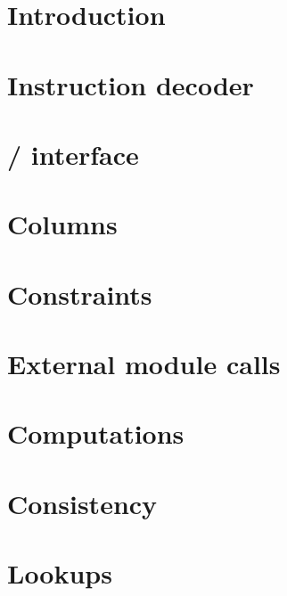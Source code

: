 

\section{Introduction}                         \label{mxp: intro}                       
\section{Instruction decoder}                  \label{mxp: instruction decoder}         
\section{\hubMod{} / \mxpMod{} interface}      \label{mxp: hub mxp interface}           
\section{Columns}                              \label{mxp: columns}                     
\section{Constraints}                          \label{mxp: constraints}                 
\section{External module calls}                \label{mxp: calls}                       
\section{Computations}                         \label{mxp: computations}                
\section{Consistency}                          \label{mxp: consistency}                 
\section{Lookups}                              \label{mxp: lookups}                     
